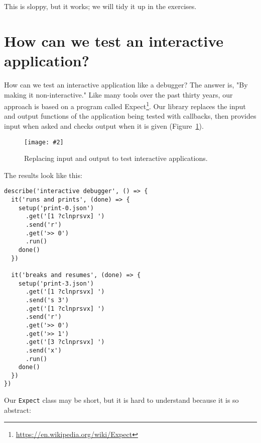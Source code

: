 \documentclass[krantzl]{krantz}
\newcommand{\figpdf}[4]{\begin{figure}%
\centering%
\texttt{[image: \#2]}%
\caption{#3}%
\label{#1}%
\end{figure}}
\newcommand{\figref}[1]{Figure~\ref{#1}}
\newcommand{\hreffoot}[2]{{#1}\footnote{\href{#2}{#2}}}
\begin{document}
\noindent This is sloppy, but it works;
we will tidy it up in the exercises.

\section{How can we test an interactive application?}\label{debugger-test}


How can we test an interactive application like a debugger?
The answer is, "By making it non-interactive."
Like many tools over the past thirty years,
our approach is based on a program called \hreffoot{Expect}{https://en.wikipedia.org/wiki/Expect}.
Our library replaces the input and output functions of the application being tested with callbacks,
then provides input when asked and checks output when it is given
(\figref{debugger-test-interact}).

\figpdf{debugger-test-interact}{./debugger/test-interact.pdf}{Replacing input and output to test interactive applications.}{0.6}


\noindent The results look like this:


\begin{lstlisting}[frame=single,frameround=tttt]
describe('interactive debugger', () => {
  it('runs and prints', (done) => {
    setup('print-0.json')
      .get('[1 ?clnprsvx] ')
      .send('r')
      .get('>> 0')
      .run()
    done()
  })

  it('breaks and resumes', (done) => {
    setup('print-3.json')
      .get('[1 ?clnprsvx] ')
      .send('s 3')
      .get('[1 ?clnprsvx] ')
      .send('r')
      .get('>> 0')
      .get('>> 1')
      .get('[3 ?clnprsvx] ')
      .send('x')
      .run()
    done()
  })
})
\end{lstlisting}



Our \texttt{Expect} class may be short,
but it is hard to understand because it is so abstract:
\end{document}
